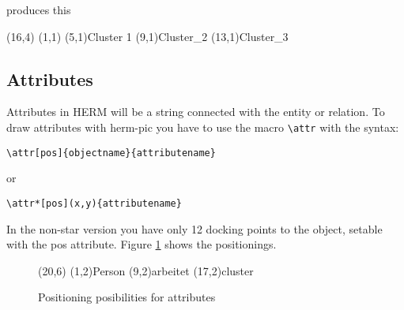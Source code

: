 \documentclass[a4paper,11pt]{article}
\begin{document}
produces this

\begin{schema}(16,4)
\cluster(1,1){}
\cluster(5,1){Cluster 1}
\cluster[cluster2](9,1){Cluster\_2}
\cluster*(13,1){Cluster\_3}
\end{schema}

\subsection{Attributes}

Attributes in HERM will be a string connected with the entity or relation.
To draw attributes with herm-pic you have to use the macro \verb|\attr| with the syntax:

\begin{verbatim}
\attr[pos]{objectname}{attributename}
\end{verbatim}

or

\begin{verbatim}
\attr*[pos](x,y){attributename}
\end{verbatim}

In the non-star version you have only 12 docking points to the object, setable with the pos attribute.
Figure \ref{fig:attr_pos} shows the positionings.

\begin{figure}[htb]
  \centering
  \begin{schema}(20,6)
  \entity(1,2){Person}
  \relation(9,2){arbeitet}
  \cluster(17,2){cluster}
\end{schema}

  \caption{Positioning posibilities for attributes}
  \label{fig:attr_pos}
\end{figure}
\end{document}
